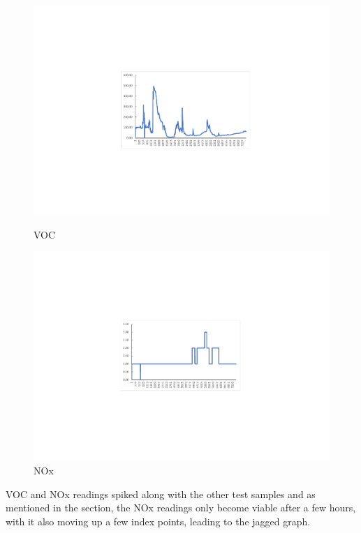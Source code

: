 \begin{figure}[!htb]
	\includegraphics[width=\linewidth]{body/fig/VOC2.0.pdf}
	\caption{VOC}\label{fig:voc}
	\endminipage\hfill
	\includegraphics[width=\linewidth]{body/fig/NOX2.0.pdf}
	\caption{NOx}\label{fig:nox}
	\endminipage\hfill

\end{figure}

\noindent
VOC and NOx readings spiked along with the other test samples and as mentioned in the section, the NOx readings only become viable after a few hours, with it also moving up a few index points, leading to the jagged graph.


